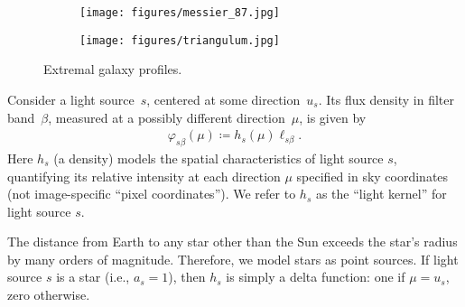 \begin{figure}
\begin{floatrow}
\end{floatrow}
\end{figure}


\begin{figure}
\begin{subfigure}{0.45\textwidth}
\texttt{[image: figures/messier\_87.jpg]}
\label{fig:dev_galaxy}
\end{subfigure}
\hfill
\begin{subfigure}{0.45\textwidth}
\texttt{[image: figures/triangulum.jpg]}
\label{fig:exp_galaxy}
\end{subfigure}
\caption{Extremal galaxy profiles.}
\label{galaxy-profiles}
\end{figure}

Consider a light source~$s$, centered at some direction~$u_s$.
Its flux density in filter band~$\beta$, measured at a possibly different direction~$\mu$,
is given by
\begin{align}
\varphi_{s\beta}(\mu) \coloneqq h_s(\mu) \ell_{s\beta}.
\end{align}
Here $h_s$ (a density) models the spatial characteristics of light source $s$, quantifying its relative intensity at each direction $\mu$ specified in sky coordinates (not image-specific ``pixel coordinates''). We refer to $h_s$ as the ``light kernel'' for light source $s$.

The distance from Earth to any star other than the Sun exceeds the star's radius by many orders of magnitude. Therefore, we model stars as point sources. If light source $s$ is a star (i.e., $a_s = 1$), then $h_s$ is simply a delta function: one if $\mu = u_s$, zero otherwise.

